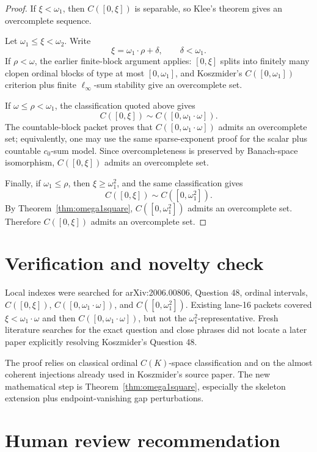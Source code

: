 \documentclass[11pt]{article}
\begin{document}
\begin{proof}
If \(\xi<\omega_1\), then \(C([0,\xi])\) is separable, so Klee's theorem gives
an overcomplete sequence.

Let \(\omega_1\leq\xi<\omega_2\).  Write
\[
   \xi=\omega_1\cdot\rho+\delta,\qquad \delta<\omega_1.
\]
If \(\rho<\omega\), the earlier finite-block argument applies: \([0,\xi]\)
splits into finitely many clopen ordinal blocks of type at most
\([0,\omega_1]\), and Koszmider's \(C([0,\omega_1])\) criterion plus finite
\(\ell_\infty\)-sum stability give an overcomplete set.

If \(\omega\leq\rho<\omega_1\), the classification quoted above gives
\[
   C([0,\xi])\sim C([0,\omega_1\cdot\omega]).
\]
The countable-block packet proves that \(C([0,\omega_1\cdot\omega])\) admits
an overcomplete set; equivalently, one may use the same sparse-exponent proof
for the scalar plus countable \(c_0\)-sum model.  Since overcompleteness is
preserved by Banach-space isomorphism, \(C([0,\xi])\) admits an overcomplete
set.

Finally, if \(\omega_1\leq\rho\), then \(\xi\geq\omega_1^2\), and the same
classification gives
\[
   C([0,\xi])\sim C([0,\omega_1^2]).
\]
By Theorem~\ref{thm:omega1square}, \(C([0,\omega_1^2])\) admits an
overcomplete set.  Therefore \(C([0,\xi])\) admits an overcomplete set.
\end{proof}

\section{Verification and novelty check}

Local indexes were searched for arXiv:2006.00806, Question 48, ordinal
intervals, \(C([0,\xi])\), \(C([0,\omega_1\cdot\omega])\), and
\(C([0,\omega_1^2])\).  Existing lane-16 packets covered
\(\xi<\omega_1\cdot\omega\) and then \(C([0,\omega_1\cdot\omega])\), but not
the \(\omega_1^2\)-representative.  Fresh literature searches for the exact
question and close phrases did not locate a later paper explicitly resolving
Koszmider's Question 48.

The proof relies on classical ordinal \(C(K)\)-space classification and on the
almost coherent injections already used in Koszmider's source paper.  The new
mathematical step is Theorem~\ref{thm:omega1square}, especially the skeleton
extension plus endpoint-vanishing gap perturbations.

\section{Human review recommendation}
\end{document}
